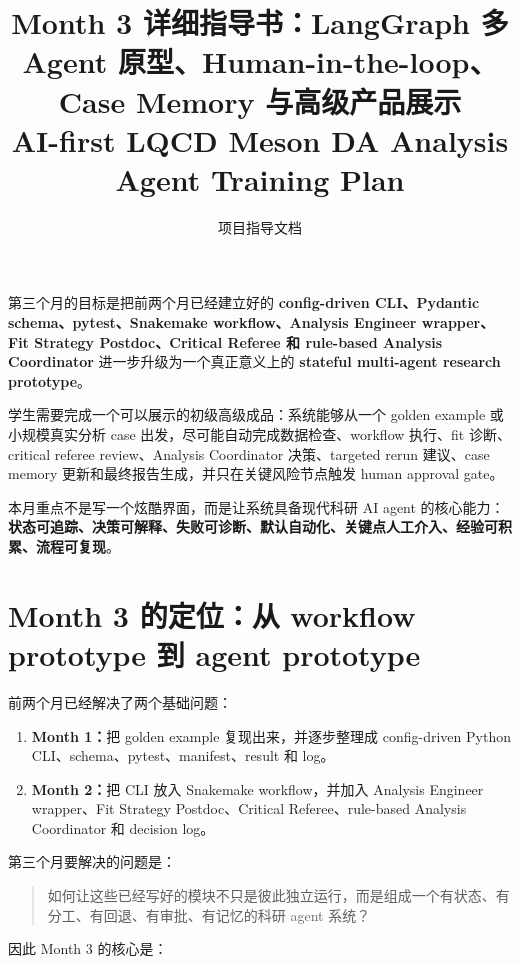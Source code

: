 \documentclass[11pt,a4paper,fontset=none]{ctexart}
\title{\textbf{Month 3 详细指导书：LangGraph 多 Agent 原型、Human-in-the-loop、Case Memory 与高级产品展示}\\
\large AI-first LQCD Meson DA Analysis Agent Training Plan}
\author{项目指导文档}
\date{ }
\begin{document}
\maketitle

\begin{tcolorbox}[colback=blue!4,colframe=darkblue,title=Month 3 总目标]
第三个月的目标是把前两个月已经建立好的 \textbf{config-driven CLI、Pydantic schema、pytest、Snakemake workflow、Analysis Engineer wrapper、Fit Strategy Postdoc、Critical Referee 和 rule-based Analysis Coordinator} 进一步升级为一个真正意义上的 \textbf{stateful multi-agent research prototype}。

学生需要完成一个可以展示的初级高级成品：系统能够从一个 golden example 或小规模真实分析 case 出发，尽可能自动完成数据检查、workflow 执行、fit 诊断、critical referee review、Analysis Coordinator 决策、targeted rerun 建议、case memory 更新和最终报告生成，并只在关键风险节点触发 human approval gate。

本月重点不是写一个炫酷界面，而是让系统具备现代科研 AI agent 的核心能力：\textbf{状态可追踪、决策可解释、失败可诊断、默认自动化、关键点人工介入、经验可积累、流程可复现}。
\end{tcolorbox}

\tableofcontents
\newpage

\section{Month 3 的定位：从 workflow prototype 到 agent prototype}

前两个月已经解决了两个基础问题：

\begin{enumerate}[leftmargin=2em]
  \item \textbf{Month 1：}把 golden example 复现出来，并逐步整理成 config-driven Python CLI、schema、pytest、manifest、result 和 log。
  \item \textbf{Month 2：}把 CLI 放入 Snakemake workflow，并加入 Analysis Engineer wrapper、Fit Strategy Postdoc、Critical Referee、rule-based Analysis Coordinator 和 decision log。
\end{enumerate}

第三个月要解决的问题是：

\begin{quote}
如何让这些已经写好的模块不只是彼此独立运行，而是组成一个有状态、有分工、有回退、有审批、有记忆的科研 agent 系统？
\end{quote}

因此 Month 3 的核心是：
\end{document}
